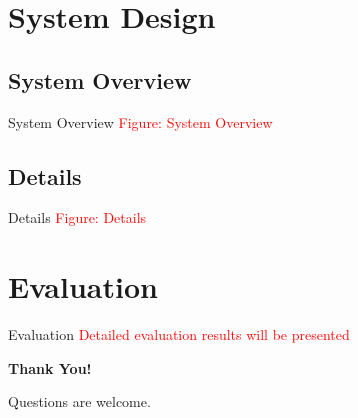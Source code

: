 \documentclass[aspectratio=43]{beamer}
\begin{document}
\section{System Design}
\subsection{System Overview}

\begin{frame}{System Overview}
  \centering
  \textcolor{red}{Figure: System Overview}
\end{frame}

\subsection{Details}

\begin{frame}{Details}
  \centering
  \textcolor{red}{Figure: Details}
\end{frame}

\section{Evaluation}

\begin{frame}{Evaluation}
  \centering
  \textcolor{red}{Detailed evaluation results will be presented}
\end{frame}


\begin{frame}
  \centering
  \Huge
  \textbf{Thank You!}

  \vspace{1em}
  \Large
  Questions are welcome.
\end{frame}




\end{document}
